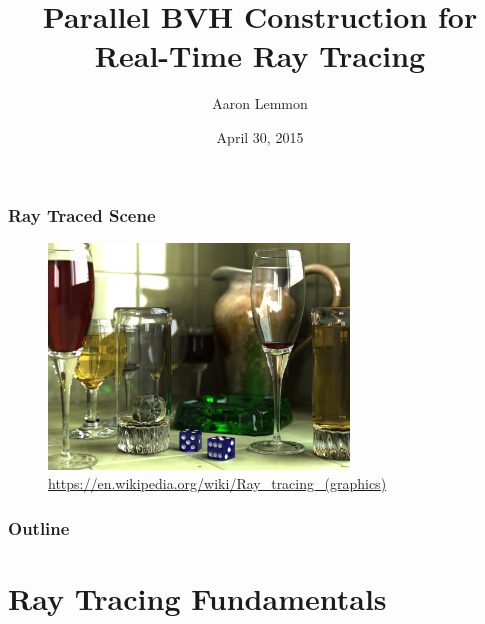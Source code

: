 \documentclass{beamer}
\begin{document}
\title{Parallel BVH Construction for Real-Time Ray Tracing}
\author{Aaron Lemmon}
\date[]  
{April 30, 2015}

\begin{frame}
  \titlepage
\end{frame}

\begin{frame}
  \frametitle{Ray Traced Scene}
\begin{figure}
\includegraphics[height=60mm]{Glasses_800_edit.png}
\hspace{6pt}\hbox{\tiny{\url{https://en.wikipedia.org/wiki/Ray_tracing_(graphics)}}}
\end{figure}



\end{frame}

\begin{frame}

  \frametitle{Outline}
\tableofcontents
\end{frame}

\section{Ray Tracing Fundamentals}
\end{document}
